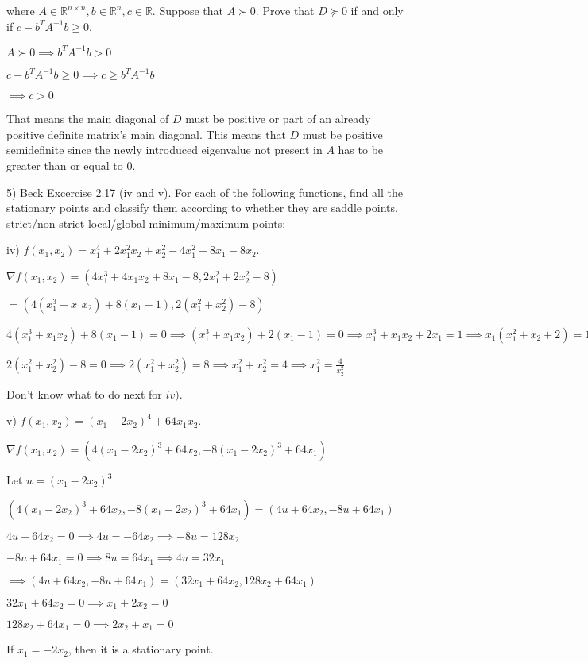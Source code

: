 \documentclass{article}
\begin{document}
where $A \in \mathbb{R}^{n \times n}, b \in \mathbb{R}^{n}, c \in \mathbb{R}.$
Suppose that $A \succ 0$. Prove that $D \succeq 0$ if and only if
$c - b^{T}A^{-1}b \geq 0$.

$A \succ 0 \implies b^{T}A^{-1}b > 0$

$c - b^{T}A^{-1}b \geq 0 \implies c \geq b^{T}A^{-1}b$

$\implies c > 0$

That means the main diagonal of $D$ must be positive or
part of an already positive definite matrix's main diagonal.
This means that $D$ must be positive semidefinite since the newly
introduced eigenvalue not present in $A$ has to be greater than or equal to $0$.


5) Beck Excercise 2.17 (iv and v). For each of the following functions,
find all the stationary points and classify them according to whether
they are saddle points, strict/non-strict local/global minimum/maximum points:

iv) $f(x_1, x_2) = x_1^4 + 2x_1^2 x_2 + x_2^2 - 4x_1^2 - 8x_1 - 8x_2$.

$\nabla f(x_1, x_2) = (4x_1^3 + 4x_1 x_2 + 8x_1 - 8, 2x_1^2 + 2x_2^2 - 8)$

$ = (4(x_1^3 + x_1 x_2) + 8(x_1 - 1), 2(x_1^2 + x_2^2) - 8)$


$4(x_1^3 + x_1 x_2) + 8(x_1 - 1) = 0
\implies (x_1^3 + x_1 x_2) + 2(x_1 - 1) = 0
\implies x_1^3 + x_1 x_2 + 2x_1 = 1
\implies x_1(x_1^2 + x_2 + 2) = 1
\implies x_1(\frac{4}{x_2^2} + x_2 + 2) = 1$

$2(x_1^2 + x_2^2) - 8 = 0
\implies 2(x_1^2 + x_2^2) = 8
\implies x_1^2 + x_2^2 = 4
\implies x_1^2 = \frac{4}{x_2^2}$

Don't know what to do next for $iv)$.



v) $f(x_1, x_2) = (x_1 - 2x_2)^4 + 64x_1 x_2$.

$\nabla f(x_1, x_2) = (4(x_1 - 2x_2)^3 + 64x_2, -8(x_1 - 2x_2)^3 + 64x_1)$

Let $u = (x_1 - 2x_2)^3$.

$(4(x_1 - 2x_2)^3 + 64x_2, -8(x_1 - 2x_2)^3 + 64x_1)
= (4u + 64x_2, -8u + 64x_1)$

$4u + 64x_2 = 0
\implies 4u = -64x_2
\implies -8u = 128x_2$

$-8u + 64x_1 = 0
\implies 8u = 64x_1
\implies 4u = 32x_1$

$\implies (4u + 64x_2, -8u + 64x_1) = (32x_1 + 64x_2, 128x_2 + 64x_1)$

$32x_1 + 64x_2 = 0
\implies x_1 + 2x_2 = 0$

$128x_2 + 64x_1 = 0
\implies 2x_2 + x_1 = 0$


If $x_1 = -2x_2$, then it is a stationary point.
\end{document}
